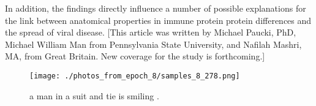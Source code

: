 \documentclass{article}%
\begin{document}
In addition, the findings directly influence a number of possible explanations for the link between anatomical properties in immune protein protein differences and the spread of viral disease.\newline%
{[}This article was written by Michael Paucki, PhD, Michael William Man from Pennsylvania State University, and Nafilah Mashri, MA, from Great Britain. New coverage for the study is forthcoming.{]}\newline%

%


\begin{figure}[h!]%
\centering%
\texttt{[image: ./photos\_from\_epoch\_8/samples\_8\_278.png]}%
\caption{a man in a suit and tie is smiling .}%
\end{figure}

%
\end{document}
